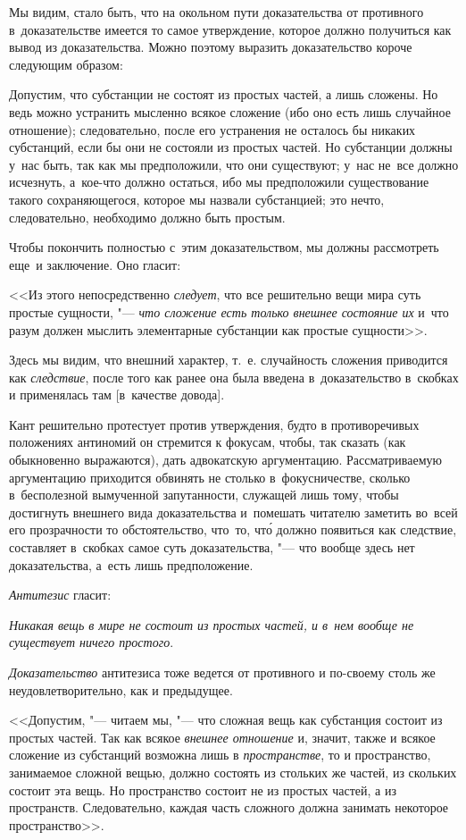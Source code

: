 Мы видим, стало быть, что на окольном пути доказательства от
противного в~доказательстве имеется то самое утверждение, которое
должно получиться как вывод из доказательства. Можно поэтому
выразить доказательство короче следующим образом:

Допустим, что субстанции не состоят из простых частей, а лишь сложены.
Но ведь можно устранить мысленно всякое сложение (ибо оно есть лишь случайное
отношение); следовательно, после его устранения не осталось бы никаких
субстанций, если бы они не состояли из простых частей. Но субстанции должны
у~нас быть, так как мы предположили, что они существуют; у~нас не~все должно
исчезнуть, а~кое-что должно остаться, ибо мы предположили существование такого
сохраняющегося, которое мы назвали субстанцией; это нечто, следовательно,
необходимо должно быть простым.

Чтобы покончить полностью с~этим доказательством, мы должны рассмотреть
еще~и заключение. Оно гласит:

<<Из этого непосредственно {\em следует}, что все решительно вещи мира суть
простые сущности, "--- {\em что сложение есть только внешнее состояние их}
и~что разум должен мыслить элементарные субстанции как простые сущности>>.

Здесь мы видим, что внешний характер, т.~е. случайность сложения приводится
как {\em следствие}, после того как ранее она была введена в~доказательство
в~скобках и применялась там [в~качестве довода].

Кант решительно протестует против утверждения, будто в противоречивых
положениях антиномий он стремится к фокусам, чтобы, так сказать (как
обыкновенно выражаются), дать адвокатскую аргументацию. Рассматриваемую
аргументацию приходится обвинять не столько в~фокусничестве, сколько
в~бесполезной вымученной запутанности, служащей лишь тому, чтобы достигнуть
внешнего вида доказательства и~помешать читателю заметить во~всей его
прозрачности то обстоятельство, что~то, чт\'{о} должно появиться как следствие,
составляет в~скобках самое суть доказательства, "--- что вообще здесь
нет доказательства, а~есть лишь предположение.

{\em Антитезис} гласит:

{\em Никакая вещь в мире не состоит из простых частей,
и в~нем вообще не существует ничего простого}.

{\em Доказательство} антитезиса тоже ведется от противного и по-своему
столь же неудовлетворительно, как и предыдущее.

<<Допустим, "--- читаем мы, "--- что сложная вещь как субстанция состоит из
простых частей. Так как всякое {\em внешнее отношение} и, значит, также и
всякое сложение из субстанций возможна лишь в {\em пространстве}, то
и пространство, занимаемое сложной вещью, должно состоять из стольких же
частей, из скольких состоит эта вещь. Но пространство состоит не из простых
частей, а из пространств. Следовательно, каждая часть сложного должна занимать
некоторое пространство>>.

